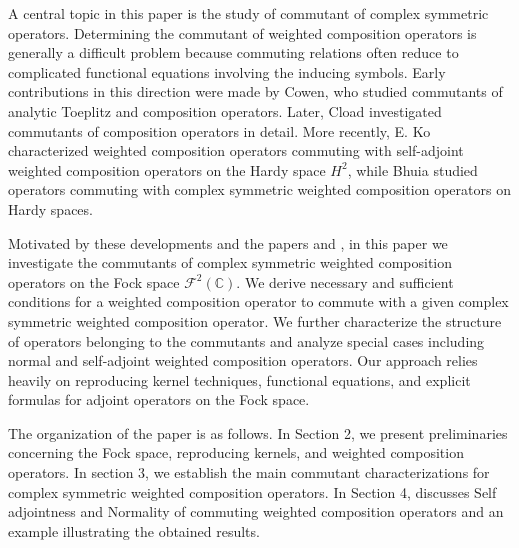 \documentclass[reqno]{amsart}
\theoremstyle{remark}
\theoremstyle{Definition}
\theoremstyle{remark}
\numberwithin{equation}{section}
\begin{document}
A central topic in this paper is the study of commutant of complex symmetric operators.
Determining the commutant of weighted composition operators is generally a difficult problem because commuting relations often reduce to complicated functional equations involving the inducing symbols. Early contributions in this direction were made by Cowen\cite{CC1,CC2}, who studied commutants of analytic Toeplitz and composition operators. Later, Cload  \cite{WC} investigated commutants of composition operators in detail. More recently, E. Ko \cite{EK} characterized weighted composition operators commuting with self-adjoint weighted composition operators on the Hardy space $H^{2}$, while Bhuia \cite{SRB} studied operators commuting with complex symmetric weighted composition operators on Hardy spaces.

Motivated by these developments and the papers \cite{SRB} and \cite{EK}, in this paper we investigate the commutants of complex symmetric weighted composition operators on the Fock space $\mathcal{F}^{2}(\mathbb{C})$. We derive necessary and sufficient conditions for a weighted composition operator to commute with a given complex symmetric weighted composition operator. We further characterize the structure of operators belonging to the commutants and analyze special cases including normal and self-adjoint weighted composition operators. Our approach relies heavily on reproducing kernel techniques, functional equations, and explicit formulas for adjoint operators on the Fock space.

The organization of the paper is as follows. In Section 2, we present preliminaries concerning the Fock space, reproducing kernels, and weighted composition operators. In section 3, we establish the main commutant characterizations for complex symmetric weighted composition operators. In Section 4, discusses Self adjointness and Normality of commuting weighted composition operators and an example illustrating the obtained results.
\end{document}
